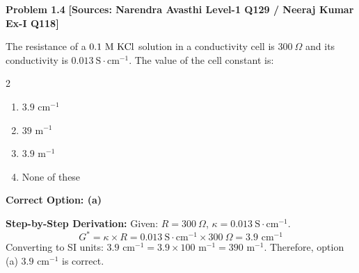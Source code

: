 \begin{problembox}
\textbf{Problem 1.4} \hfill \textbf{[Sources: Narendra Avasthi Level-1 Q129 / Neeraj Kumar Ex-I Q118]}

The resistance of a $0.1\text{ M } \ce{KCl}$ solution in a conductivity cell is $300\ \Omega$ and its conductivity is $0.013\ \text{S}\cdot\text{cm}^{-1}$. The value of the cell constant is:
\begin{multicols}{2}
\begin{enumerate}[label=(\alph*)]
    \item $3.9\text{ cm}^{-1}$
    \item $39\text{ m}^{-1}$
    \item $3.9\text{ m}^{-1}$
    \item None of these
\end{enumerate}
\end{multicols}
\end{problembox}
\begin{solution}
\textbf{Correct Option: (a)}

\textbf{Step-by-Step Derivation:}
Given:
$R = 300\ \Omega$, $\kappa = 0.013\ \text{S}\cdot\text{cm}^{-1}$.
\begin{equation*}
    G^* = \kappa \times R = 0.013\ \text{S}\cdot\text{cm}^{-1} \times 300\ \Omega = 3.9\text{ cm}^{-1}
\end{equation*}
Converting to SI units:
$3.9\text{ cm}^{-1} = 3.9 \times 100\text{ m}^{-1} = 390\text{ m}^{-1}$.
Therefore, option (a) $3.9\text{ cm}^{-1}$ is correct.
\end{solution}

